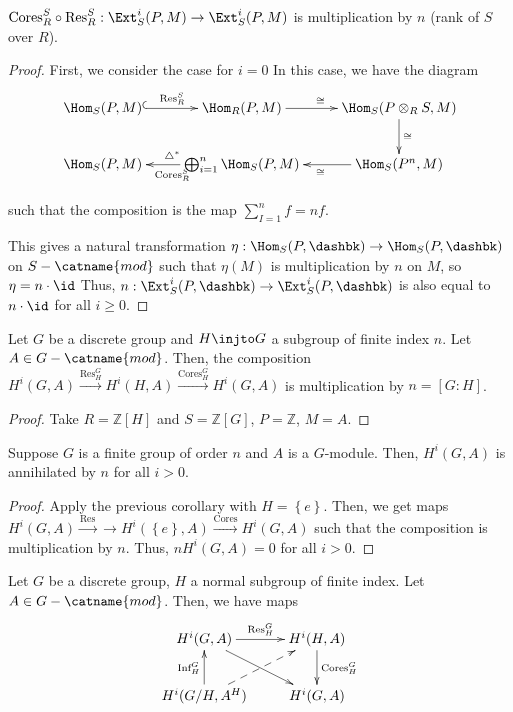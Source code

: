 \documentclass[12pt]{scrartcl}
\begin{document}
\begin{proposition}
	$\text{Cores}_R^S \circ \text{Res}_R^S : \Ext_S^i(P, M) \to \Ext_S^i(P, M)$ is multiplication by $n$ (rank of $S$ over $R$).
\end{proposition}

\begin{proof}
First, we consider the case for $i=0$
In this case, we have the diagram
\[
\xymatrix{
	\Hom_S(P, M) \ar@{^{(}->}[r]^{\text{Res}_R^S} & \Hom_R(P, M) \ar[r]^{\cong} & \Hom_S(P \otimes_R S, M) \ar[d]^{\cong} \\
				      \Hom_S(P, M) & \bigoplus_{i=1}^n \Hom_S(P, M) \ar[l]^{\text{Cores}_R^S}_{\triangle^{*}} & \Hom_S(P^n, M) \ar[l]^{\cong}
}
\]

such that the composition is the map $\sum_{I=1}^n f = nf$.

This gives a natural transformation $\eta: \Hom_S(P, \dashbk) \to \Hom_S(P, \dashbk)$ on $S-\catname{mod}$
such that $\eta(M)$ is multiplication by $n$ on $M$, so $\eta = n \cdot \id$
Thus, $n: \Ext_S^i(P, \dashbk) \to \Ext_S^i(P, \dashbk)$ is also equal to $n \cdot \id$ for all $i\geq 0$.   
\end{proof}

\begin{corollary}
	Let $G$ be a discrete group and $H \injto G$ a subgroup of finite index $n$.
	Let $A \in G-\catname{mod}$.
	Then, the composition $H^i(G, A) \xrightarrow{\text{Res}_H^G} H^i(H, A) \xrightarrow{\text{Cores}_H^G} H^i(G, A)$  
	is multiplication by $n = [G : H]$.
\end{corollary}
\begin{proof}
	Take $R = \mathbb{Z}[H]$ and $S = \mathbb{Z}[G]$, $P = \mathbb{Z}$, $M = A$.
\end{proof}
\begin{corollary}
	Suppose $G$ is a finite group of order $n$ and $A$ is a $G$-module.
	Then, $H^i(G, A)$ is annihilated by $n$ for all $i>0$. 
\end{corollary}
\begin{proof}
	Apply the previous corollary with $H = \left\{e\right\}$.
	Then, we get maps $H^i(G, A) \xrightarrow{\text{Res}} \to H^i(\left\{e\right\}, A) \xrightarrow{\text{Cores}} H^i(G, A)$  such that the composition is multiplication by $n$.
	Thus, $nH^i(G, A) = 0$ for all $i>0$.
\end{proof}
Let $G$ be a discrete group, $H$ a normal subgroup of finite index.
Let $A \in G-\catname{mod}$.
Then, we have maps
\[
\xymatrix{
	H^i(G, A) \ar[r]^{\text{Res}_H^G} \ar[dr]& H^i(H, A) \ar[d]^{\text{Cores}_H^G} \\
	H^i(G/H, A^H) \ar[u]^{\text{Inf}_H^G} \ar@{-->}[ur] & H^i(G, A) \\
}
\]
\end{document}
